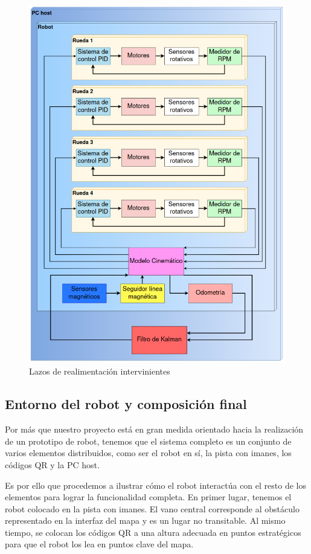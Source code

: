 \begin{figure}[H]
    \centering
    \includegraphics[width=0.8\linewidth]{images/integ_sistema_diag_compensacion.png}
    \caption{Lazos de realimentación intervinientes}
    \label{fig:integsistemalazosrealim}
\end{figure}


\subsection{Entorno del robot y composición final}

Por más que nuestro proyecto está en gran medida orientado hacia la realización de un prototipo de robot, tenemos que el sistema completo es un conjunto de varios elementos distribuidos, como ser el robot en sí, la pista con imanes, los códigos QR y la PC host.

Es por ello que procedemos a ilustrar cómo el robot interactúa con el resto de los elementos para lograr la funcionalidad completa. En primer lugar, tenemos el robot colocado en la pista con imanes. El vano central corresponde al obstáculo representado en la interfaz del mapa y es un lugar no transitable. Al mismo tiempo, se colocan los códigos QR a una altura adecuada en puntos estratégicos para que el robot los lea en puntos clave del mapa.

